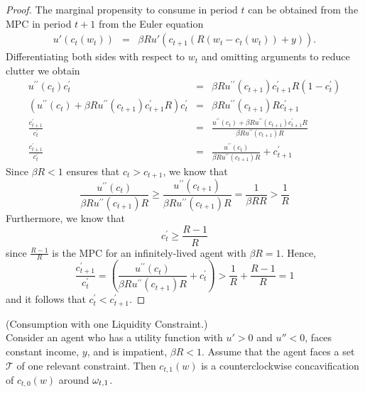 	\begin{proof}
	The marginal propensity to consume in period $t$ can be obtained from the MPC in period $t+1$ from the Euler equation
	\begin{eqnarray*}
		u'(c_{t}(w_{t})) & =  & \beta R u'(c_{t+1}(R(w_{t}-c_{t}(w_{t}))+{y})).
	\end{eqnarray*}
	Differentiating both sides with respect to $w_{t}$ and omitting arguments to reduce
	clutter we obtain
	\begin{eqnarray*}
		u^{\prime\prime}(c_{t})c_{t}^{\prime} & =  & \beta R u^{\prime\prime}(c_{t+1})c_{t+1}^{\prime}R(1-c_{t}^{\prime}) \nonumber
		\\ \nonumber (u^{\prime\prime}(c_{t}) + \beta R u^{\prime\prime}(c_{t+1})c_{t+1}^{\prime}R)c_{t}^{\prime} & = & \beta R u^{\prime\prime}(c_{t+1})Rc_{t+1}^{\prime}
		\\ \frac{c_{t+1}^{\prime}}{c_{t}^{\prime}}   & = & \frac{u^{\prime\prime}(c_{t}) + \beta R u^{\prime\prime}(c_{t+1})c_{t+1}^{\prime}R}{\beta R u^{\prime\prime}(c_{t+1})R} \label{eq:mpcPF} \\
		\frac{c_{t+1}^{\prime}}{c_{t}^{\prime}}   & = & \frac{u^{\prime\prime}(c_{t})}{\beta R u^{\prime\prime}(c_{t+1})R} + c_{t+1}^{\prime} %
	\end{eqnarray*}
	Since $\beta R < 1$ ensures that $c_{t} > c_{t+1}$, we know that
	\[\frac{u^{\prime\prime}(c_{t})}{\beta R u^{\prime\prime}(c_{t+1})R} \geq  \frac{u^{\prime\prime}(c_{t+1})}{\beta R u^{\prime\prime}(c_{t+1})R} = \frac{1}{\beta R R} > \frac{1}{R}\]
	Furthermore, we know that
	\[c_{t}^{\prime} \geq \frac{R-1}{R}\]
	since $\frac{R-1}{R}$ is the MPC for an infinitely-lived agent with $\beta R = 1$. Hence,
	\[\frac{c_{t+1}^{\prime}}{c_{t}^{\prime}} = \left(\frac{u^{\prime\prime}(c_{t})}{\beta R u^{\prime\prime}(c_{t+1})R} + c_{t}^{\prime} \right) > \frac{1}{R} + \frac{R-1}{R} = 1\]
	and it follows that $c_{t}^{\prime} <  c_{t+1}^{\prime}$.
	\end{proof}
	
	\begin{lemma}\label{lem:pfclc}(Consumption with one Liquidity Constraint.) \\
		Consider an agent who has a utility function with $u'> 0 $ and $u'' < 0$, faces constant income, ${y}$, and is impatient, $\beta R < 1$. Assume that the agent faces a set $\mathcal{T}$ of one relevant constraint. Then $c_{t,1}(w)$ is a counterclockwise concavification of $c_{t,0}(w)$ around $\omega_{t,1}$.
	\end{lemma}
	
